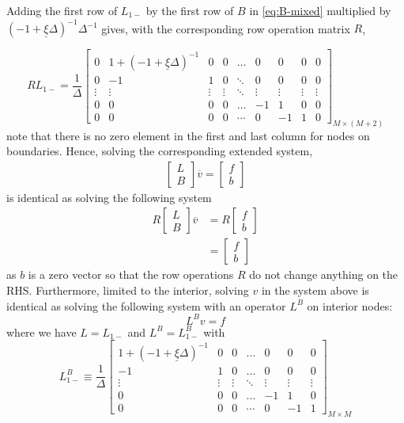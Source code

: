 \documentclass[11pt]{article}
\theoremstyle{definition}
\begin{document}
Adding the first row of $L_{1-}$ by the first row of $B$ in \eqref{eq:B-mixed} multiplied by $(-1 + \underline{\xi} \Delta )^{-1}\Delta^{-1}$ gives, with the corresponding row operation matrix $R$,

\begin{equation}
R {L}_{1-} = \dfrac{1}{\Delta} \begin{bmatrix}
0&1 + (-1 + \underline{\xi}\Delta )^{-1}&0&0&\dots&0&0&0&0\\
0&-1&1&0&\ddots&0&0&0&0\\
\vdots&\vdots&\vdots&\vdots&\ddots&\vdots&\vdots&\vdots&\vdots\\
0&0&0&0&\dots&-1&1&0&0\\
0&0&0&0&\cdots&0&-1&1&0
\end{bmatrix}_{M\times (M+2)}
\end{equation}
note that there is no zero element in the first and last column for nodes on boundaries. Hence, solving the corresponding extended system,
\begin{align}
\begin{bmatrix}
{L}\\
B
\end{bmatrix} 
\overline{v} 
=
\begin{bmatrix}
f \\ b
\end{bmatrix}
\end{align}
is identical as solving the following system
\begin{align}
R
\begin{bmatrix}
{L}\\
B
\end{bmatrix} 
\overline{v} 
&=
R
\begin{bmatrix}
f \\ b
\end{bmatrix} \\
&= \begin{bmatrix}
f \\ b
\end{bmatrix}
\end{align}
as $b$ is a zero vector so that the row operations $R$ do not change anything on the RHS. Furthermore, limited to the interior, solving $v$ in the system above is identical as solving the following system with an operator $L^B$ on interior nodes:
\begin{equation}\label{eq:system-on-interior}
L^B v = f
\end{equation}
where we have ${L} = {L}_{1-}$ and $L^B = L_{1-}^B$ with
\begin{equation}
L_{1-}^B \equiv \frac{1}{\Delta}\begin{bmatrix}
1 + (-1 + \underline{\xi} \Delta)^{-1} &0&0&\dots&0&0&0\\
-1&1&0&\dots&0&0&0\\
\vdots&\vdots&\vdots&\ddots&\vdots&\vdots&\vdots\\
0&0&0&\dots&-1&1&0\\
0&0&0&\cdots&0&-1&1
\end{bmatrix}_{M\times M} \label{eq:L-1-regular}
\end{equation}
\end{document}
